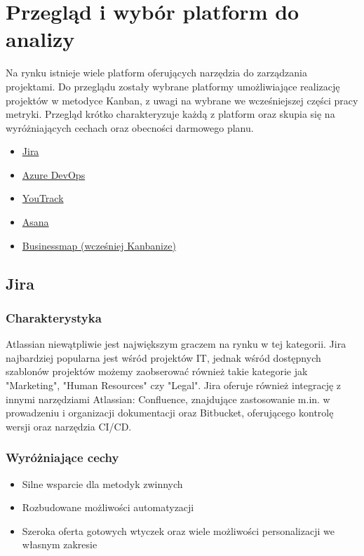 \section{Przegląd i wybór platform do analizy}
Na rynku istnieje wiele platform oferujących narzędzia do zarządzania projektami. Do przeglądu zostały wybrane platformy umożliwiające realizację projektów w metodyce Kanban, z uwagi na wybrane we wcześniejszej
części pracy metryki. Przegląd krótko charakteryzuje każdą z platform oraz skupia się na wyróżniających cechach oraz obecności darmowego planu.
\begin{itemize}
    \item \href{https://www.atlassian.com/software/jira}{Jira}
    \item \href{https://azure.microsoft.com/en-us/products/devops/}{Azure DevOps}
    \item \href{https://www.jetbrains.com/youtrack/}{YouTrack}
    \item \href{https://asana.com/}{Asana}
    \item \href{https://businessmap.io/}{Businessmap (wcześniej Kanbanize)}
\end{itemize}

\subsection*{Jira}
\subsubsection*{Charakterystyka}
Atlassian niewątpliwie jest największym graczem na rynku w tej kategorii. Jira najbardziej popularna jest wśród projektów IT, jednak wśród dostępnych szablonów projektów możemy zaobserować również takie
kategorie jak "Marketing", "Human Resources" czy "Legal". Jira oferuje również integrację z innymi narzędziami Atlassian: Confluence, znajdujące zastosowanie m.in. w prowadzeniu i organizacji dokumentacji oraz
Bitbucket, oferującego kontrolę wersji oraz narzędzia CI/CD.
\subsubsection*{Wyróżniające cechy}
\begin{itemize}
    \item Silne wsparcie dla metodyk zwinnych
    \item Rozbudowane możliwości automatyzacji
    \item Szeroka oferta gotowych wtyczek oraz wiele możliwości personalizacji we własnym zakresie
\end{itemize}
